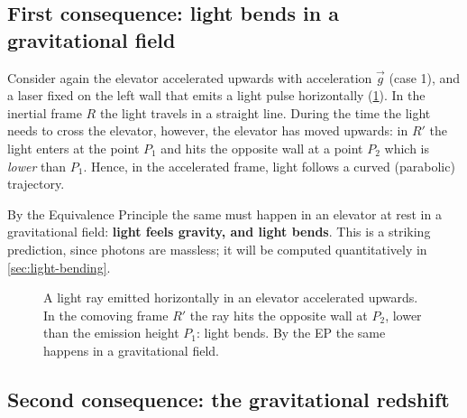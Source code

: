 \subsection{First consequence: light bends in a gravitational field}

Consider again the elevator accelerated upwards with acceleration $\vec g$ (case 1), and a laser fixed on the left wall that emits a light pulse horizontally (\cref{fig:lightbend}). In the inertial frame $R$ the light travels in a straight line. During the time the light needs to cross the elevator, however, the elevator has moved upwards: in $R'$ the light enters at the point $P_1$ and hits the opposite wall at a point $P_2$ which is \emph{lower} than $P_1$. Hence, in the accelerated frame, light follows a curved (parabolic) trajectory.

By the Equivalence Principle the same must happen in an elevator at rest in a gravitational field: \textbf{light feels gravity, and light bends}. This is a striking prediction, since photons are massless; it will be computed quantitatively in \cref{sec:light-bending}.

\begin{figure}[ht]
\centering
{}
\caption{A light ray emitted horizontally in an elevator accelerated upwards. In the comoving frame $R'$ the ray hits the opposite wall at $P_2$, lower than the emission height $P_1$: light bends. By the EP the same happens in a gravitational field.}
\label{fig:lightbend}
\end{figure}

\subsection{Second consequence: the gravitational redshift}\label{sec:redshift-ep}

